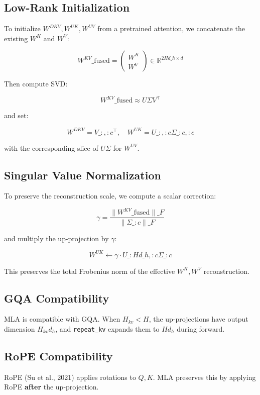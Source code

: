 \subsection{Low-Rank Initialization}

To initialize $W^{DKV}, W^{UK}, W^{UV}$ from a pretrained attention, we 
concatenate the existing $W^K$ and $W^V$:

\[
W^{KV}\_\text{fused} = \begin{pmatrix} W^K \\ W^V \end{pmatrix} \in \mathbb{R}^{2 H d\_h \times d}
\tag{3.6}
\]

Then compute SVD:

\[
W^{KV}\_\text{fused} \approx U \Sigma V^\top
\tag{3.7}
\]

and set:

\[
W^{DKV} = V\_{:, :c}^\top, \quad
W^{UK} = U\_{:, :c} \Sigma\_{:c, :c}
\tag{3.8}
\]

with the corresponding slice of $U \Sigma$ for $W^{UV}$.

\subsection{Singular Value Normalization}

To preserve the reconstruction scale, we compute a scalar correction:

\[
\gamma = \frac{\|W^{KV}\_\text{fused}\|\_F}{\|\Sigma\_{:c}\|\_F}
\tag{3.9}
\]

and multiply the up-projection by $\gamma$:

\[
W^{UK} \leftarrow \gamma \cdot U\_{:H d\_h, :c} \Sigma\_{:c}
\tag{3.10}
\]

This preserves the total Frobenius norm of the effective $W^K, W^V$ 
reconstruction.

\subsection{GQA Compatibility}

MLA is compatible with GQA. When $H_{kv} < H$, the up-projections have 
output dimension $H_{kv} d_h$, and \texttt{repeat\_kv} expands them to $H d_h$ 
during forward.

\subsection{RoPE Compatibility}

RoPE (Su et al., 2021) applies rotations to $Q, K$. MLA preserves this by 
applying RoPE \textbf{after} the up-projection.

